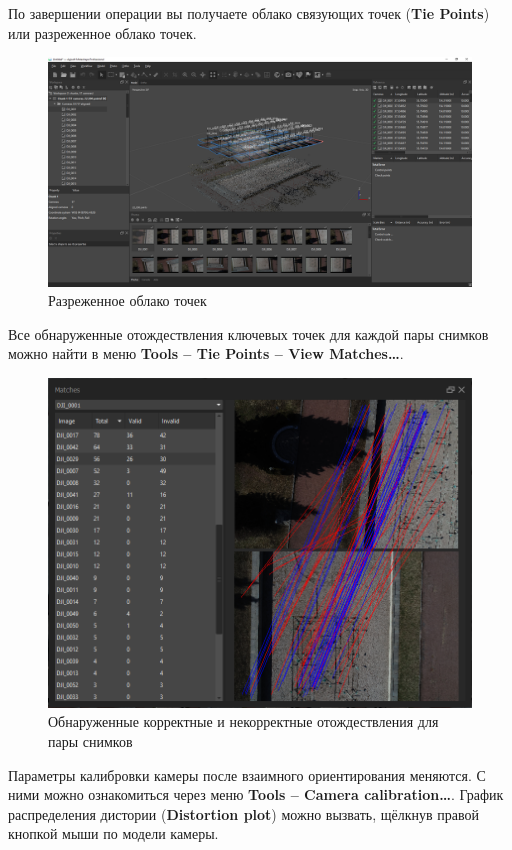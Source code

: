 \documentclass[
  12pt,
]{book}
\begin{document}
По завершении операции вы получаете облако связующих точек (\textbf{Tie Points}) или разреженное облако точек.

\begin{figure}
\centering
\includegraphics{images/Ref18/Sparse_Cloud.png}
\caption{Разреженное облако точек}
\end{figure}

Все обнаруженные отождествления ключевых точек для каждой пары снимков можно найти в меню \textbf{Tools -- Tie Points -- View Matches\ldots{}}.

\begin{figure}
\centering
\includegraphics{images/Ref18/Matches.png}
\caption{Обнаруженные корректные и некорректные отождествления для пары снимков}
\end{figure}

Параметры калибровки камеры после взаимного ориентирования меняются. С ними можно ознакомиться через меню \textbf{Tools -- Camera calibration\ldots{}}. График распределения дистории (\textbf{Distortion plot}) можно вызвать, щёлкнув правой кнопкой мыши по модели камеры.
\end{document}
